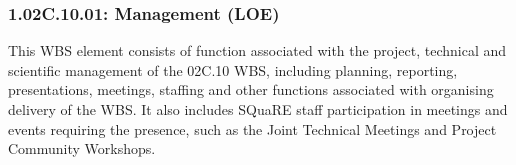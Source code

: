\subsubsection{1.02C.10.01: Management (LOE)}

This WBS element consists of function associated with the project, technical and scientific management of the 02C.10 WBS, including planning, reporting, presentations, meetings, staffing and other functions associated with organising delivery of the WBS. It also includes SQuaRE staff participation in meetings and events requiring the presence, such as the Joint Technical Meetings and Project Community Workshops.




